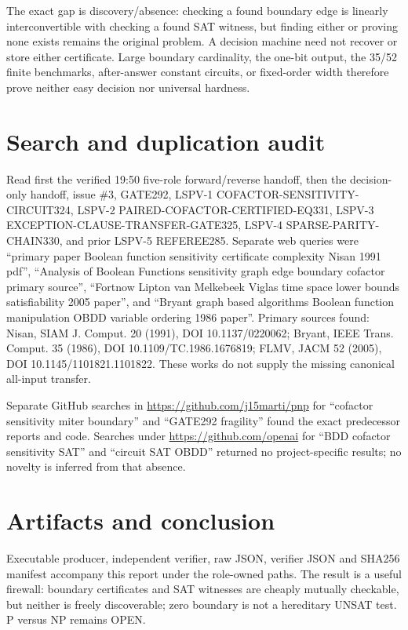 \documentclass[11pt]{article}
\begin{document}
The exact gap is discovery/absence: checking a found boundary edge is linearly interconvertible with checking a found SAT witness, but finding either or proving none exists remains the original problem. A decision machine need not recover or store either certificate. Large boundary cardinality, the one-bit output, the 35/52 finite benchmarks, after-answer constant circuits, or fixed-order width therefore prove neither easy decision nor universal hardness.

\section{Search and duplication audit}
Read first the verified 19:50 five-role forward/reverse handoff, then the decision-only handoff, issue \#3, GATE292, LSPV-1 COFACTOR-SENSITIVITY-CIRCUIT324, LSPV-2 PAIRED-COFACTOR-CERTIFIED-EQ331, LSPV-3 EXCEPTION-CLAUSE-TRANSFER-GATE325, LSPV-4 SPARSE-PARITY-CHAIN330, and prior LSPV-5 REFEREE285. Separate web queries were ``primary paper Boolean function sensitivity certificate complexity Nisan 1991 pdf'', ``Analysis of Boolean Functions sensitivity graph edge boundary cofactor primary source'', ``Fortnow Lipton van Melkebeek Viglas time space lower bounds satisfiability 2005 paper'', and ``Bryant graph based algorithms Boolean function manipulation OBDD variable ordering 1986 paper''. Primary sources found: Nisan, SIAM J. Comput. 20 (1991), DOI 10.1137/0220062; Bryant, IEEE Trans. Comput. 35 (1986), DOI 10.1109/TC.1986.1676819; FLMV, JACM 52 (2005), DOI 10.1145/1101821.1101822. These works do not supply the missing canonical all-input transfer.

Separate GitHub searches in \url{https://github.com/j15marti/pnp} for ``cofactor sensitivity miter boundary'' and ``GATE292 fragility'' found the exact predecessor reports and code. Searches under \url{https://github.com/openai} for ``BDD cofactor sensitivity SAT'' and ``circuit SAT OBDD'' returned no project-specific results; no novelty is inferred from that absence.

\section{Artifacts and conclusion}
Executable producer, independent verifier, raw JSON, verifier JSON and SHA256 manifest accompany this report under the role-owned paths. The result is a useful firewall: boundary certificates and SAT witnesses are cheaply mutually checkable, but neither is freely discoverable; zero boundary is not a hereditary UNSAT test. P versus NP remains OPEN.
\end{document}
